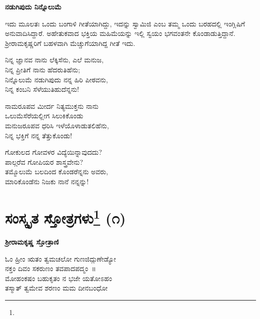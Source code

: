 \selectkan

\begin{center}
\textbf{ನಡುಗಿಪುದು ನಿನ್ನೊಲುಮೆ}
\end{center}

ಇದು ಮೂಲತಃ ಒಂದು ಬಂಗಾಳಿ ಗೀತೆಯಾಗಿದ್ದು, ಇದನ್ನು ಸ್ವಾಮಿಜಿ  ಎಂಬ ತಮ್ಮ ಒಂದು ಬರಹದಲ್ಲಿ ಇಂಗ್ಲಿಷಿಗೆ ಅನುವಾದಿಸಿದ್ದಾರೆ. ಅಹೇತುಕವಾದ ಭಕ್ತಿಯ ಮಹಿಮೆಯನ್ನು ಇಲ್ಲಿ ಸ್ವಯಂ ಭಗವಂತನೇ ಕೊಂಡಾಡುತ್ತಿದ್ದಾನೆ. ಶ‍್ರೀರಾಮಕೃಷ್ಣರಿಗೆ ಬಹಳವಾಗಿ ಮೆಚ್ಚುಗೆಯಾಗಿದ್ದ ಗೀತೆ ಇದು.

\begin{myquote}
ನಿನ್ನ ಜ್ಞಾನವ ನಾನು ಲೆಕ್ಕಿಸೆನು, ಎಲೆ ಮನುಜ,\\ನಿನ್ನ ಪ್ರೀತಿಗೆ ನಾನು ಹೆದರುತಿಹೆನು;\\ನಿನ್ನೊಲುಮೆ ನಡುಗಿಪುದು ನನ್ನ ಹಿರಿ ಪೀಠವನು,\\ನಿನ್ನ ಕಂಬನಿ ಸೆಳೆಯುತಿಹುದೆನ್ನನು!
\end{myquote}

\begin{myquote}
ನಾಮರೂಪವ ಮೀರ್ದ ನಿತ್ಯಮುಕ್ತನು ನಾನು\\ಒಲುಮೆಸೆರೆಯಲ್ಲೀಗ ಸಿಲುಕಿಕೊಂಡು\\ಮನುಜರೂಪವ ಧರಿಸಿ ಇಳೆಯೊಳಾಡುತಲಿಹೆನು,\\ನಿನ್ನ ಭಕ್ತಿಗೆ ನನ್ನ ತೆತ್ತುಕೊಂಡು!
\end{myquote}

\begin{myquote}
ಗೋಕುಲದ ಗೋವಳರ ವಿದ್ಯೆಯಿನ್ನಾವುದದು?\\ಪಾಲ್ಗರೆವ ಗೋಪಿಯರ ಶಾಸ್ತ್ರವೇನು?\\ತಮ್ಮೊಲುಮೆ ಬಲದಿಂದ ಕೊಂಡರೆನ್ನನು ಅವರು,\\ಮಾರಿಕೊಂಡೆನು ನಿಜಕು ನಾನೆ ನನ್ನನ್ನು!
\end{myquote}

\selectkan

\insertlangkanintotoc

\chapter[ಸಂಸ್ಕೃತ ಸ್ತೋತ್ರಗಳು]{ಸಂಸ್ಕೃತ ಸ್ತೋತ್ರಗಳು\protect\footnote{} (೧)}

\begin{center}
\textbf{ಶ‍್ರೀರಾಮಕೃಷ್ಣ ಸ್ತೋತ್ರಾಣಿ}
\end{center}

\begin{myquote}
ಓಂ ಹ್ರೀಂ ಋತಂ ತ್ವಮಚಲೋ ಗುಣಜಿದ್ಗುಣೇಡ್ಯೋ\\ನಕ್ತಂ ದಿವಂ ಸಕರುಣಂ ತವಪಾದಪದ್ಮಂ~॥\\ಮೋಹಂಕಷಂ ಬಹುಕೃತಂ ನ ಭಜೇ ಯತೋಽಹಂ\\ತಸ್ಮಾತ್ ತ್ವಮೇವ ಶರಣಂ ಮಮ ದೀನಬಂಧೋ
\end{myquote}

